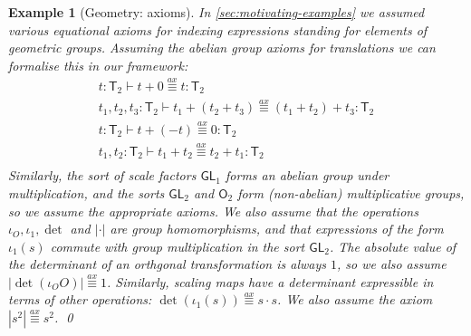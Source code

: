 \documentclass{sigplanconf}
\newcommand{\abs}[1]{\lvert #1 \rvert}
\newcommand{\SynGL}[1]{\mathsf{GL}_#1}
\newcommand{\SynOrth}[1]{\mathsf{O}_#1}
\newcommand{\SynTransl}[1]{\mathsf{T}_#1}
\theoremstyle{examplestyle}
\newtheorem*{example*}{Example}
\theoremstyle{restatementstyle}
\begin{document}
\begin{example*}[Geometry: axioms]
  \label{ex:two-dim-geo-axioms}
  In \autoref{sec:motivating-examples} we assumed 
  various equational axioms %
  for indexing expressions standing for
  elements of geometric groups. Assuming the abelian group axioms for
  translations we can formalise this in our %
  framework:
  \begin{displaymath}
    \begin{array}{l}
      t : \SynTransl{2} \vdash t + 0 \stackrel{ax}\equiv t : \SynTransl{2} \\
      t_1, t_2, t_3 : \SynTransl{2} \vdash t_1 + (t_2 + t_3) \stackrel{ax}\equiv (t_1 + t_2) + t_3 : \SynTransl{2} \\
      t : \SynTransl{2} \vdash t + (-t) \stackrel{ax}\equiv 0 : \SynTransl{2} \\
      t_1, t_2 : \SynTransl{2} \vdash t_1 + t_2 \stackrel{ax}\equiv t_2 + t_1 : \SynTransl{2} \\
    \end{array}
  \end{displaymath}
  Similarly, the sort of scale factors $\SynGL{1}$ forms an abelian
  group under multiplication, and the sorts $\SynGL{2}$ and
  $\SynOrth{2}$ form (non-abelian) multiplicative groups, so we assume
  the appropriate axioms. We also assume that the operations $\iota_O,
  \iota_1, \det$ and $\abs{\cdot}$ are group homomorphisms, and that
  expressions of the form $\iota_1(s)$ commute with group
  multiplication in the sort $\SynGL{2}$. The absolute value of the
  determinant of an orthgonal transformation is always $1$, so we also
  assume $\abs{\det(\iota_OO)} \stackrel{ax}\equiv 1$. Similarly,
  scaling maps have a determinant expressible in terms of other
  operations: $\det(\iota_1(s)) \stackrel{ax}\equiv s \cdot s$. We
  also assume the axiom $|s^2| \stackrel{ax}\equiv s^2$.  \qed
\end{example*}
\end{document}
